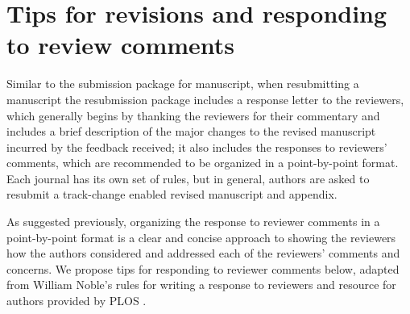 \documentclass[
]{book}
\begin{document}
\hypertarget{tips-for-revisions-and-responding-to-review-comments}{%
\section*{Tips for revisions and responding to review comments}\label{tips-for-revisions-and-responding-to-review-comments}}

Similar to the submission package for manuscript, when resubmitting a manuscript the resubmission package includes a response letter to the reviewers, which generally begins by thanking the reviewers for their commentary and includes a brief description of the major changes to the revised manuscript incurred by the feedback received; it also includes the responses to reviewers' comments, which are recommended to be organized in a point-by-point format. Each journal has its own set of rules, but in general, authors are asked to resubmit a track-change enabled revised manuscript and appendix.

As suggested previously, organizing the response to reviewer comments in a point-by-point format is a clear and concise approach to showing the reviewers how the authors considered and addressed each of the reviewers' comments and concerns. We propose tips for responding to reviewer comments below, adapted from William Noble's rules for writing a response to reviewers \citep{noble2017ten} and resource for authors provided by PLOS \citep{plos2021peerfeedback}.
\end{document}
